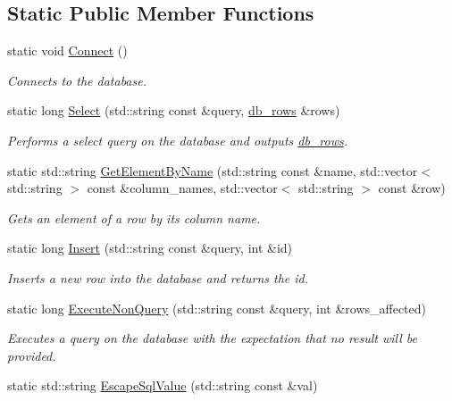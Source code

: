 \subsection*{Static Public Member Functions}
\begin{DoxyCompactItemize}
\item 
static void \hyperlink{classDb_1_1Db_acb6baca594f012e54b3b413fc8490909}{Connect} ()
\begin{DoxyCompactList}\small\item\em Connects to the database. \end{DoxyCompactList}\item 
static long \hyperlink{classDb_1_1Db_a7adcafeb518814ae624e81bd998fe2c7}{Select} (std\-::string const \&query, \hyperlink{structDb_1_1db__rows}{db\-\_\-rows} \&rows)
\begin{DoxyCompactList}\small\item\em Performs a select query on the database and outputs \hyperlink{structDb_1_1db__rows}{db\-\_\-rows}. \end{DoxyCompactList}\item 
static std\-::string \hyperlink{classDb_1_1Db_a4a39f1b4090a66e07a9997c05291e857}{Get\-Element\-By\-Name} (std\-::string const \&name, std\-::vector$<$ std\-::string $>$ const \&column\-\_\-names, std\-::vector$<$ std\-::string $>$ const \&row)
\begin{DoxyCompactList}\small\item\em Gets an element of a row by its column name. \end{DoxyCompactList}\item 
static long \hyperlink{classDb_1_1Db_ade8f079023aa580603606d862afaba36}{Insert} (std\-::string const \&query, int \&id)
\begin{DoxyCompactList}\small\item\em Inserts a new row into the database and returns the id. \end{DoxyCompactList}\item 
static long \hyperlink{classDb_1_1Db_a7b7432985c8391482226a42a59e206fc}{Execute\-Non\-Query} (std\-::string const \&query, int \&rows\-\_\-affected)
\begin{DoxyCompactList}\small\item\em Executes a query on the database with the expectation that no result will be provided. \end{DoxyCompactList}\item 
static std\-::string \hyperlink{classDb_1_1Db_a6959db84448d62d069c761e3ce25d52c}{Escape\-Sql\-Value} (std\-::string const \&val)

\end{DoxyCompactItemize}
